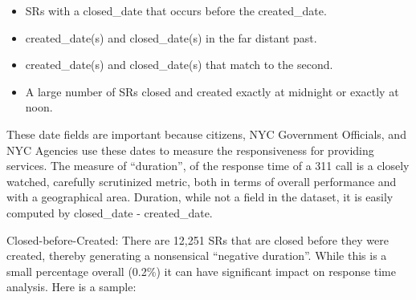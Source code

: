 \documentclass[12pt, titlepage]{article}
\begin{document}
	\begin{itemize}
		\item SRs with a closed\_date that occurs before the created\_date.
	 	\item created\_date(s) and closed\_date(s) in the far distant past.
	 	\item created\_date(s) and closed\_date(s) that match to the second.
		\item A large number of SRs closed and created exactly at midnight 
		or exactly at noon. 
	\end{itemize}
	
	These date fields are important because citizens, NYC Government Officials, 
	and NYC Agencies use these dates to measure the 
	responsiveness for providing services. The measure of ``duration'',	 
	of the response time of a 311 call is a closely 
	watched, carefully scrutinized metric, both in terms of overall performance 
	and with a geographical area. Duration, while not a field in the dataset, 
	it is easily computed by closed\_date - created\_date.
	
	Closed-before-Created:  There are 12,251 SRs that are closed before they 
	were created, thereby generating a nonsensical ``negative duration''. 
	While this is a small percentage overall (0.2\%) it can have significant impact 
	on response time analysis. Here is a sample:
	
\end{document}
